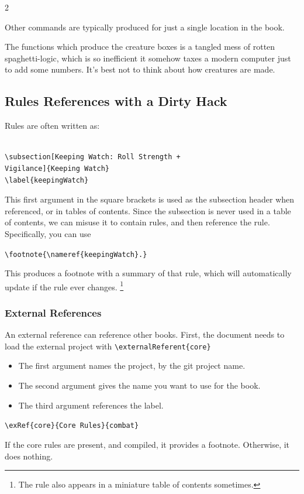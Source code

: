 \documentclass[a4paper,openany]{book}
\begin{document}
\begin{multicols}{2}

Other commands are typically produced for just a single location in the book.

The functions which produce the creature boxes is a tangled mess of rotten spaghetti-logic, which is so inefficient it somehow taxes a modern computer just to add some numbers.
It's best not to think about how creatures are made.

\subsection{Rules References with a Dirty Hack}

Rules are often written as:

\begin{verbatim}

\subsection[Keeping Watch: Roll Strength +
Vigilance]{Keeping Watch}
\label{keepingWatch}

\end{verbatim}

This first argument in the square brackets is used as the subsection header when referenced, or in tables of contents.
Since the subsection is never used in a table of contents, we can misuse it to contain rules, and then reference the rule.
Specifically, you can use

\verb"\footnote{\nameref{keepingWatch}.}"

This produces a footnote with a summary of that rule, which will automatically update if the rule ever changes.
\footnote{The rule also appears in a miniature table of contents sometimes.}

\subsubsection{External References}

An external reference can reference other books.
First, the document needs to load the external project with \verb"\externalReferent{core}"


\begin{itemize}
  \item
  The first argument names the project, by the git project name.
  \item
  The second argument gives the name you want to use for the book.
  \item
  The third argument references the label.
\end{itemize}

\verb"\exRef{core}{Core Rules}{combat}"

If the core rules are present, and compiled, it provides a footnote.
Otherwise, it does nothing.%

\end{multicols}

\printindex[spells]

\printglossary[
  type=symbols,
]

\printglossary[
  style=topicmcols,
  type=mech,
]

\printglossary[
  style=topicmcols,
]

\glsaddall
\end{document}
